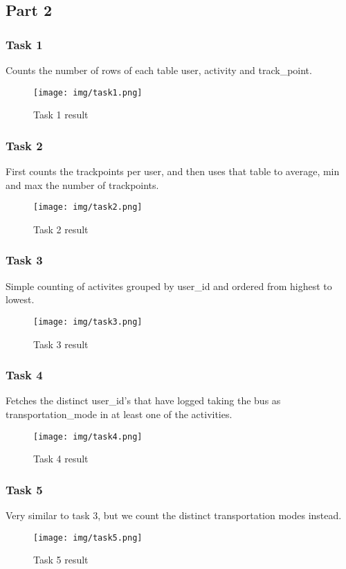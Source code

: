 \documentclass[12pt, titlepage]{report}
\begin{document}
\subsection*{Part 2}
\subsubsection*{Task 1}
Counts the number of rows of each table user, activity and track\_point.
\begin{figure}[H]
    \centering
    \texttt{[image: img/task1.png]}
    \caption{Task 1 result}
    \label{fig:my_label}
\end{figure}
\subsubsection*{Task 2}
First counts the trackpoints per user, and then uses that table to average, min and max the number of trackpoints.
\begin{figure}[H]
    \centering
    \texttt{[image: img/task2.png]}
    \caption{Task 2 result}
    \label{fig:my_label}
\end{figure}
\subsubsection*{Task 3}
Simple counting of activites grouped by user\_id and ordered from highest to lowest.
\begin{figure}[H]
    \centering
    \texttt{[image: img/task3.png]}
    \caption{Task 3 result}
    \label{fig:my_label}
\end{figure}
\subsubsection*{Task 4}
Fetches the distinct user\_id's that have logged taking the bus as transportation\_mode in at least one of the activities.
\begin{figure}[H]
    \centering
    \texttt{[image: img/task4.png]}
    \caption{Task 4 result}
    \label{fig:my_label}
\end{figure}
\subsubsection*{Task 5}
Very similar to task 3, but we count the distinct transportation modes instead. 
\begin{figure}[H]
    \centering
    \texttt{[image: img/task5.png]}
    \caption{Task 5 result}
    \label{fig:my_label}
\end{figure}
\end{document}
